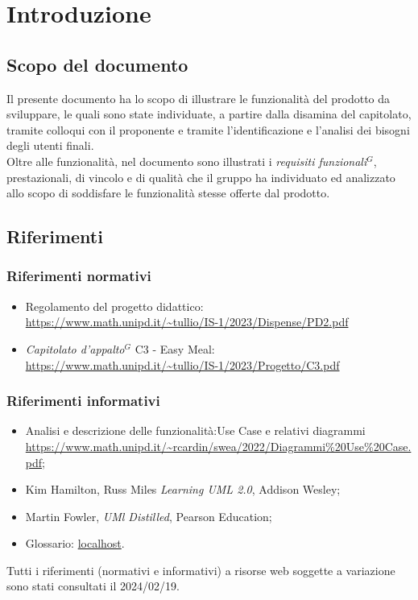 
\section{Introduzione}

\subsection{Scopo del documento}

Il presente documento ha lo scopo di illustrare le funzionalità del prodotto da sviluppare,
le quali sono state individuate, a partire dalla disamina del capitolato, tramite colloqui con
il proponente e tramite l'identificazione e l'analisi dei bisogni degli utenti finali.\\
Oltre alle funzionalità, nel documento sono illustrati i \emph{requisiti funzionali}$^{G}$, prestazionali, di
vincolo e di qualità che il gruppo ha individuato ed analizzato allo scopo di soddisfare le
funzionalità stesse offerte dal prodotto.

\subsection{Riferimenti}
\subsubsection{Riferimenti normativi}

\begin{itemize}
    \item Regolamento del progetto didattico: \\
    \url{https://www.math.unipd.it/~tullio/IS-1/2023/Dispense/PD2.pdf}
  \item \emph{Capitolato d’appalto}$^{G}$ C3 - Easy Meal: \\
    \url{https://www.math.unipd.it/~tullio/IS-1/2023/Progetto/C3.pdf}
\end{itemize}

\subsubsection{Riferimenti informativi}

\begin{itemize}
    \item Analisi e descrizione delle funzionalità:Use Case e relativi diagrammi \url{https://www.math.unipd.it/~rcardin/swea/2022/Diagrammi%20Use%20Case.pdf};
    \item Kim Hamilton, Russ Miles \emph{Learning UML 2.0}, Addison Wesley;
    \item Martin Fowler, \emph{UMl Distilled}, Pearson Education;
    \item Glossario: \url{localhost}.
\end{itemize}

Tutti i riferimenti (normativi e informativi) a risorse web soggette a variazione sono stati consultati il 2024/02/19.
